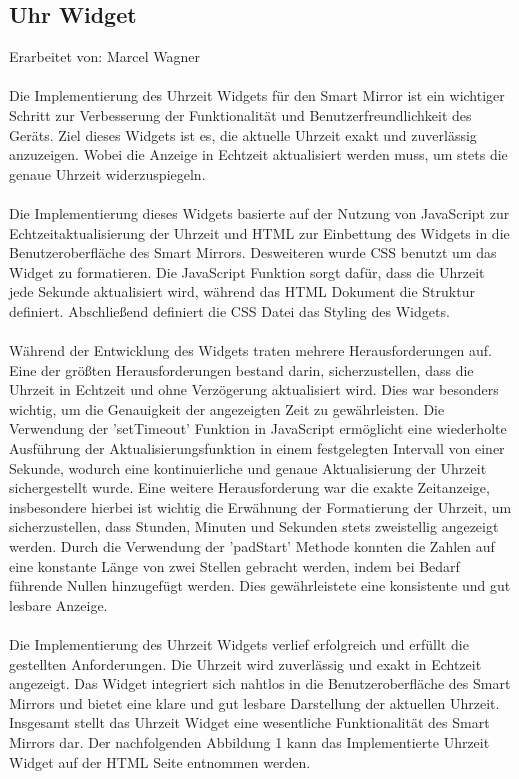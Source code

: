\subsection{Uhr Widget}
Erarbeitet von: Marcel Wagner \\ \\
\noindent
Die Implementierung des Uhrzeit Widgets für den Smart Mirror ist ein wichtiger Schritt zur Verbesserung der Funktionalität und Benutzerfreundlichkeit des Geräts. Ziel dieses Widgets ist es, die aktuelle Uhrzeit exakt und zuverlässig anzuzeigen. Wobei die Anzeige in Echtzeit aktualisiert werden muss, um stets die genaue Uhrzeit widerzuspiegeln.\\ \\
Die Implementierung dieses Widgets basierte auf der Nutzung von JavaScript zur Echtzeitaktualisierung der Uhrzeit und HTML zur Einbettung des Widgets in die Benutzeroberfläche des Smart Mirrors. Desweiteren wurde CSS benutzt um das Widget zu formatieren. Die JavaScript Funktion sorgt dafür, dass die Uhrzeit jede Sekunde aktualisiert wird, während das HTML Dokument die Struktur definiert. Abschließend definiert die CSS Datei das Styling des Widgets. \\ \\
\noindent
Während der Entwicklung des Widgets traten mehrere Herausforderungen auf. Eine der größten Herausforderungen bestand darin, sicherzustellen, dass die Uhrzeit in Echtzeit und ohne Verzögerung aktualisiert wird. Dies war besonders wichtig, um die Genauigkeit der angezeigten Zeit zu gewährleisten. Die Verwendung der 'setTimeout' Funktion in JavaScript ermöglicht eine wiederholte Ausführung der Aktualisierungsfunktion in einem festgelegten Intervall von einer Sekunde, wodurch eine kontinuierliche und genaue Aktualisierung der Uhrzeit sichergestellt wurde.
Eine weitere Herausforderung war die exakte Zeitanzeige, insbesondere hierbei ist wichtig die Erwähnung der Formatierung der Uhrzeit, um sicherzustellen, dass Stunden, Minuten und Sekunden stets zweistellig angezeigt werden. Durch die Verwendung der 'padStart' Methode konnten die Zahlen auf eine konstante Länge von zwei Stellen gebracht werden, indem bei Bedarf führende Nullen hinzugefügt werden. Dies gewährleistete eine konsistente und gut lesbare Anzeige.\\ \\
\noindent
Die Implementierung des Uhrzeit Widgets verlief erfolgreich und erfüllt die gestellten Anforderungen. Die Uhrzeit wird zuverlässig und exakt in Echtzeit angezeigt. Das Widget integriert sich nahtlos in die Benutzeroberfläche des Smart Mirrors und bietet eine klare und gut lesbare Darstellung der aktuellen Uhrzeit.
Insgesamt stellt das Uhrzeit Widget eine wesentliche Funktionalität des Smart Mirrors dar. Der nachfolgenden Abbildung 1 kann das Implementierte Uhrzeit Widget auf der HTML Seite entnommen werden.

